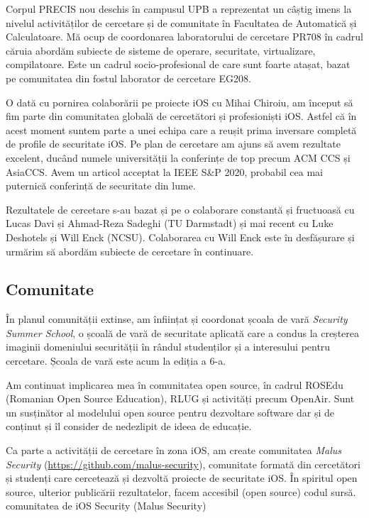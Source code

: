 \documentclass[11pt,a4paper]{article}
\begin{document}
Corpul PRECIS nou deschis în campusul UPB a reprezentat un câștig imens la nivelul activităților de cercetare și de comunitate în Facultatea de Automatică și Calculatoare. Mă ocup de coordonarea laboratorului de cercetare PR708 în cadrul căruia abordăm subiecte de sisteme de operare, securitate, virtualizare, compilatoare. Este un cadrul socio-profesional de care sunt foarte atașat, bazat pe comunitatea din fostul laborator de cercetare EG208.

O dată cu pornirea colaborării pe proiecte iOS cu Mihai Chiroiu, am început să fim parte din comunitatea globală de cercetători și profesioniști iOS. Astfel că în acest moment suntem parte a unei echipa care a reușit prima inversare completă de profile de securitate iOS. Pe plan de cercetare am ajuns să avem rezultate excelent, ducând numele universității la conferințe de top precum ACM CCS și AsiaCCS. Avem un articol acceptat la IEEE S\&P 2020, probabil cea mai puternică conferință de securitate din lume.

Rezultatele de cercetare s-au bazat și pe o colaborare constantă și fructuoasă cu Lucas Davi și Ahmad-Reza Sadeghi (TU Darmstadt) și mai recent cu Luke Deshotels și Will Enck (NCSU). Colaborarea cu Will Enck este în desfășurare și urmărim să abordăm subiecte de cercetare în continuare.

\subsection*{Comunitate}

În planul comunității extinse, am înființat și coordonat școala de vară \textit{Security Summer School}, o școală de vară de securitate aplicată care a condus la creșterea imaginii domeniului securității în rândul studenților și a interesului pentru cercetare. Școala de vară este acum la ediția a 6-a.

Am continuat implicarea mea în comunitatea open source, în cadrul ROSEdu (Romanian Open Source Education), RLUG și activități precum OpenAir. Sunt un susținător al modelului open source pentru dezvoltare software dar și de conținut și îl consider de nedezlipit de ideea de educație.

Ca parte a activității de cercetare în zona iOS, am create comunitatea \textit{Malus Security} (\url{https://github.com/malus-security}), comunitate formată din cercetători și studenți care cercetează și dezvoltă proiecte de securitate iOS. În spiritul open source, ulterior publicării rezultatelor, facem accesibil (open source) codul sursă.
comunitatea de iOS Security (Malus Security)
\end{document}
